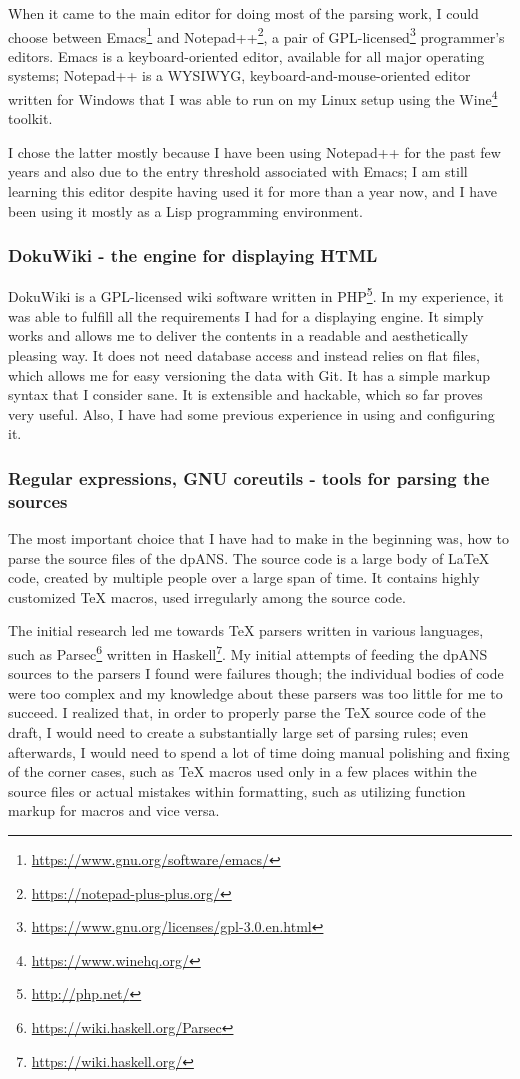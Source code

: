 When it came to the main editor for doing most of the parsing work, I could choose between Emacs\footnote{\url{https://www.gnu.org/software/emacs/}} and Notepad++\footnote{\url{https://notepad-plus-plus.org/}}, a pair of GPL-licensed\footnote{\url{https://www.gnu.org/licenses/gpl-3.0.en.html}} programmer's editors. Emacs is a keyboard-oriented editor, available for all major operating systems; Notepad++ is a WYSIWYG, keyboard-and-mouse-oriented editor written for Windows that I was able to run on my Linux setup using the Wine\footnote{\url{https://www.winehq.org/}} toolkit.

I chose the latter mostly because I have been using Notepad++ for the past few years and also due to the entry threshold associated with Emacs; I am still learning this editor despite having used it for more than a year now, and I have been using it mostly as a Lisp programming environment.

\subsubsection{DokuWiki - the engine for displaying HTML}

DokuWiki is a GPL-licensed wiki software written in PHP\footnote{\url{http://php.net/}}. In my experience, it was able to fulfill all the requirements I had for a displaying engine. It simply works and allows me to deliver the contents in a readable and aesthetically pleasing way. It does not need database access and instead relies on flat files, which allows me for easy versioning the data with Git. It has a simple markup syntax that I consider sane. It is extensible and hackable, which so far proves very useful. Also, I have had some previous experience in using and configuring it.

\subsubsection{Regular expressions, GNU coreutils - tools for parsing the sources}

The most important choice that I have had to make in the beginning was, how to parse the source files of the dpANS. The source code is a large body of \LaTeX{} code, created by multiple people over a large span of time. It contains highly customized \TeX{} macros, used irregularly among the source code.

The initial research led me towards \TeX{} parsers written in various languages, such as Parsec\footnote{\url{https://wiki.haskell.org/Parsec}} written in Haskell\footnote{\url{https://wiki.haskell.org/}}. My initial attempts of feeding the dpANS sources to the parsers I found were failures though; the individual bodies of code were too complex and my knowledge about these parsers was too little for me to succeed. I realized that, in order to properly parse the \TeX{} source code of the draft, I would need to create a substantially large set of parsing rules; even afterwards, I would need to spend a lot of time doing manual polishing and fixing of the corner cases, such as \TeX{} macros used only in a few places within the source files or actual mistakes within formatting, such as utilizing function markup for macros and vice versa.

